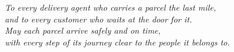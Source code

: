 \vspace*{\fill}
\begin{center}
\large\itshape
To every delivery agent who carries a parcel the last mile,\\
and to every customer who waits at the door for it.\\[1.2em]
May each parcel arrive safely and on time,\\
with every step of its journey clear to the people it belongs to.
\end{center}
\vspace*{\fill}
